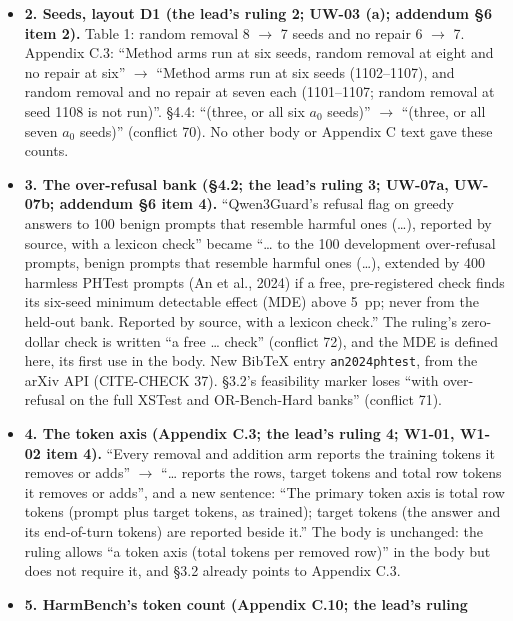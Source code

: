 \documentclass{article}
\theoremstyle{plain}
\theoremstyle{definition}
\theoremstyle{remark}
\begin{document}
\begin{itemize}
        UW-08 (a)'s recommended text (conflict 76).
  \item \textbf{2. Seeds, layout D1 (the lead's ruling 2; UW-03 (a); addendum
        \S{}6 item 2).} Table 1: random removal 8 $\to$ 7 seeds and no repair 6
        $\to$ 7. Appendix C.3: ``Method arms run at six seeds, random removal at
        eight and no repair at six'' $\to$ ``Method arms run at six seeds
        (1102--1107), and random removal and no repair at seven each
        (1101--1107; random removal at seed 1108 is not run)''. \S{}4.4:
        ``(three, or all six $a_0$ seeds)'' $\to$ ``(three, or all seven $a_0$
        seeds)'' (conflict 70). No other body or Appendix C text gave these
        counts.
  \item \textbf{3. The over-refusal bank (\S{}4.2; the lead's ruling 3; UW-07a,
        UW-07b; addendum \S{}6 item 4).} ``Qwen3Guard's refusal flag on greedy
        answers to 100 benign prompts that resemble harmful ones (\ldots{}),
        reported by source, with a lexicon check'' became ``\ldots{} to the 100
        development over-refusal prompts, benign prompts that resemble harmful
        ones (\ldots{}), extended by 400 harmless PHTest prompts (An et al.,
        2024) if a free, pre-registered check finds its six-seed minimum
        detectable effect (MDE) above 5~pp; never from the held-out bank.
        Reported by source, with a lexicon check.'' The ruling's zero-dollar
        check is written ``a free \ldots{} check'' (conflict 72), and the MDE is
        defined here, its first use in the body. New BibTeX entry
        \texttt{an2024phtest}, from the arXiv API (CITE-CHECK 37). \S{}3.2's
        feasibility marker loses ``with over-refusal on the full XSTest and
        OR-Bench-Hard banks'' (conflict 71).
  \item \textbf{4. The token axis (Appendix C.3; the lead's ruling 4; W1-01,
        W1-02 item 4).} ``Every removal and addition arm reports the training
        tokens it removes or adds'' $\to$ ``\ldots{} reports the rows, target
        tokens and total row tokens it removes or adds'', and a new sentence:
        ``The primary token axis is total row tokens (prompt plus target tokens,
        as trained); target tokens (the answer and its end-of-turn tokens) are
        reported beside it.'' The body is unchanged: the ruling allows ``a token
        axis (total tokens per removed row)'' in the body but does not require
        it, and \S{}3.2 already points to Appendix C.3.
  \item \textbf{5. HarmBench's token count (Appendix C.10; the lead's ruling
}
\end{itemize}
\end{document}
